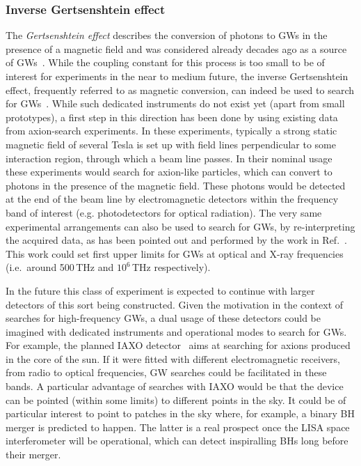 \documentclass[11pt,a4paper]{article}
\begin{document}
\subsubsection{Inverse Gertsenshtein effect}
\label{sec:inv_gertsenshtein}
The \textit{Gertsenshtein effect} describes the conversion of photons to GWs in the presence of a magnetic field and was considered already decades ago as a source of GWs~\cite{Gertsenshtein}. While the coupling constant for this process is too small to be of interest for experiments in the near to medium future, the inverse Gertsenshtein effect, frequently referred to as magnetic conversion, can indeed be used to search for GWs~\cite{Boccaletti1970,Fuzfa:2015oaa,Fuzfa:2017ana}. While such dedicated instruments do not exist yet (apart from small prototypes), a first step in this direction has been done by using existing data from axion-search experiments. In these experiments, typically a strong static magnetic field of several Tesla is set up with field lines perpendicular to some interaction region, through which a beam line passes. In their nominal usage these experiments would search for axion-like particles, which can convert to photons in the presence of the magnetic field. These photons would be detected at the end of the beam line by electromagnetic detectors within the frequency band of interest (e.g. photodetectors for optical radiation).
The very same experimental arrangements can also be used to search for GWs, by re-interpreting the acquired data,
as has been pointed out and performed by the work in Ref.~\cite{Ejlli2019}.
This work could set first upper limits for GWs at optical and X-ray frequencies (i.e.\ around 500\,THz and $10^{6}$\,THz respectively).

In the future this class of experiment is expected to continue with larger detectors of this sort being constructed. Given the motivation in the context of searches for high-frequency GWs, a dual usage of these detectors could be imagined
with dedicated instruments and operational modes to search for GWs. For example, the planned IAXO detector~\cite{Armengaud:2014gea} aims at searching for axions produced in the core of the sun. If it were  fitted with different electromagnetic receivers, from radio to optical frequencies, GW searches could be facilitated in these bands. A particular advantage of searches with IAXO would be that the device can be pointed (within some limits) to different points in the sky. It could be of particular interest to point to patches in the sky where, for example, a binary BH merger is predicted to happen. The latter is a real prospect once the LISA space interferometer will be operational, which can detect inspiralling BHs long before their merger.
\end{document}
